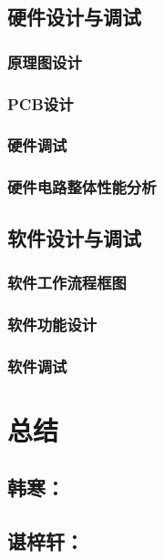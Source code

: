\documentclass{zjureport}
\begin{document}
	\subsection{硬件设计与调试}
	
	\subsubsection{原理图设计}
	
	\subsubsection{PCB设计}
	
	\subsubsection{硬件调试}
	
	\subsubsection{硬件电路整体性能分析}
	
	\subsection{软件设计与调试}
	
	\subsubsection{软件工作流程框图}
	
	\subsubsection{软件功能设计}
	
	\subsubsection{软件调试}
	
	\section{总结}
	
	\subsection{韩寒：}
	
	\subsection{谌梓轩：}
	
	
\end{document}
